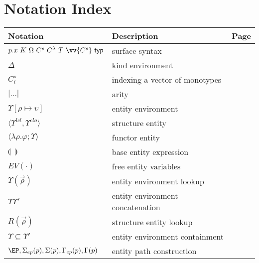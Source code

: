 
\chapter{Notation Index}\label{ch:notation-index}

\begin{tabular}{|l|l|l|}
\hline
Notation & Description & Page\\
\hline
$p.x~K~\Omega~C^s~C^\lambda~T~\vv{C^s}~\mathsf{typ}$ & surface syntax & \pageref{fig:semtypesystem}\\
\hline
$\Delta$ & kind environment & \pageref{fig:kindingsyntactic}\\
$C^s_i$ & indexing a vector of monotypes & \pageref{sec:typesystem-kindsystem}\\
$|\ldots|$ & arity & \pageref{sec:typesystem-notation}\\
\hline
$\Upsilon[\rho\mapsto \upsilon]$ & entity environment & \pageref{fig:entities}\\
$\langle\Upsilon^{lcl}, \Upsilon^{clo}\rangle$ & structure entity & \pageref{fig:entities}\\
$\langle\lambda\rho.\varphi; \Upsilon\rangle$ & functor entity & \pageref{fig:entities}\\
$\llparenthesis~~\rrparenthesis$ & base entity expression & \pageref{fig:entities}\\
$EV(\cdot)$ & free entity variables & \pageref{sec:entitycalc-notation}\\
$\Upsilon(\vec{\rho})$ & entity environment lookup & \pageref{sec:entitycalc-notation}\\
$\Upsilon\Upsilon'$ & entity environment concatenation & \pageref{sec:entitycalc-notation}\\
$R(\vec{\rho})$ & structure entity lookup & \pageref{sec:entitycalc-notation}\\
$\Upsilon \subseteq \Upsilon'$ & entity environment containment & \pageref{sec:entitycalc-notation}\\
$\EP,\Sigma_{ep}(p),\Sigma(p),\Gamma_{ep}(p), \Gamma(p)$ & entity path construction & \pageref{sec:elabnotation}\\

\hline
\end{tabular}

